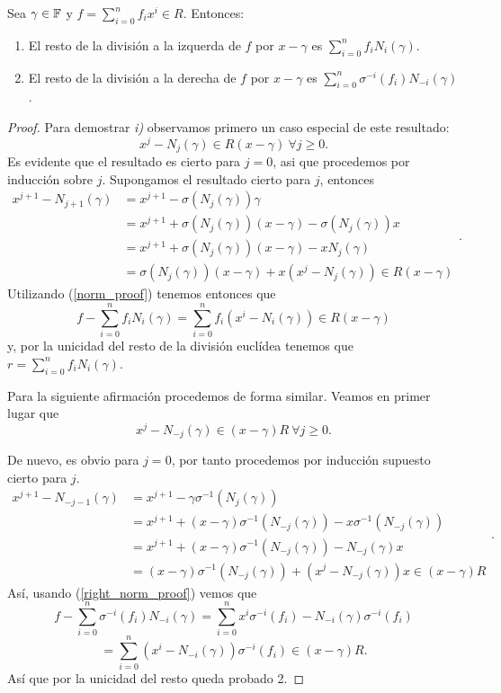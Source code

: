 \begin{lemma}
\label{lem:eval}
    Sea \(\gamma \in \mathbb{F}\) y  \(f = \sum_{i=0}^n f_ix^i \in R\). Entonces:
    \begin{enumerate}
    \item El resto de la división a la izquerda de \(f\) por  \(x - \gamma\) es  \(\sum_{i=0}^{n} f_i N_i(\gamma)\).
    \item El resto de la división a la derecha de \(f\) por  \(x - \gamma\) es  \(\sum_{i=0}^{n}\sigma^{-i}(f_i)N_{-i}(\gamma)\).
    \end{enumerate}
\end{lemma}
\begin{proof}
    Para demostrar \textit{i)} observamos primero un caso especial de este resultado:
\begin{equation}
\label{norm_proof}
    x^j - N_j(\gamma) \in R(x-\gamma)\ \forall j \geq 0.
\end{equation}
    Es evidente que el resultado es cierto para \(j = 0\), asi que procedemos por inducción sobre \(j\). Supongamos el resultado cierto para \(j\), entonces
\[
\begin{aligned}
x^{j+1} - N_{j+1}(\gamma) &= x^{j+1} - \sigma(N_j(\gamma))\gamma \\
&= x^{j+1} +  \sigma(N_j(\gamma))(x-\gamma) - \sigma(N_j(\gamma))x \\
&= x^{j+1} +  \sigma(N_j(\gamma))(x-\gamma) - xN_j(\gamma) \\
&= \sigma(N_j(\gamma))(x-\gamma) + x(x^{j} - N_j(\gamma)) \in R(x-\gamma)
\end{aligned}
.\]
Utilizando (\ref{norm_proof}) tenemos entonces que
\[
f - \sum_{i=0}^n f_i N_i(\gamma) = \sum_{i=0}^n f_i(x^i - N_i(\gamma)) \in R(x - \gamma)
\]
y, por la unicidad del resto de la división euclídea tenemos que \(r = \sum_{i=0}^n f_i N_i(\gamma)\).

Para la siguiente afirmación procedemos de forma similar. Veamos en primer lugar que
\begin{equation}
\label{right_norm_proof}
    x^j - N_{-j}(\gamma) \in (x-\gamma)R\ \forall j \geq 0.
\end{equation}

De nuevo, es obvio para \(j = 0\), por tanto procedemos por inducción supuesto cierto para \(j\).
\[
\begin{aligned}
x^{j+1} - N_{-j-1}(\gamma) &= x^{j+1} - \gamma\sigma^{-1}(N_j(\gamma))  \\
&= x^{j+1} +  (x-\gamma)\sigma^{-1}(N_{-j}(\gamma)) - x\sigma^{-1}(N_{-j}(\gamma)) \\
&= x^{j+1} + (x-\gamma)\sigma^{-1}(N_{-j}(\gamma)) - N_{-j}(\gamma)x \\
&= (x-\gamma)\sigma^{-1}(N_{-j}(\gamma)) + (x^{j} - N_{-j}(\gamma))x \in (x-\gamma)R
\end{aligned}
.\]
Así, usando (\ref{right_norm_proof}) vemos que
\[
f - \sum_{i=0}^n \sigma^{-i}(f_i) N_{-i}(\gamma) = \sum_{i=0}^n x^i\sigma^{-i}(f_i) - N_{-i}(\gamma)\sigma^{-i}(f_i)
\]
\[
= \sum_{i=0}^n (x^i - N_{-i}(\gamma))\sigma^{-i}(f_i) \in (x - \gamma)R
.\]
Así que por la unicidad del resto queda probado 2.
\end{proof}
